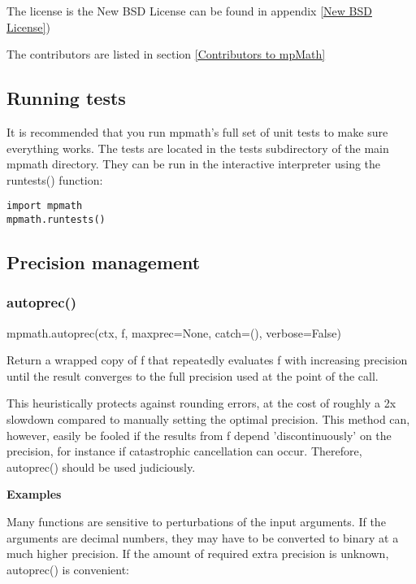 \vpara
The license is the New BSD License  can be found in appendix \ref{New BSD License})

The contributors are listed in section \ref{Contributors to mpMath}



\subsection{Running tests}

It is recommended that you run mpmath's full set of unit tests to make sure everything works. The tests are located in the tests subdirectory of the main mpmath directory. They can be run in the interactive interpreter using the runtests() function:


\begin{lstlisting}
import mpmath
mpmath.runtests()
\end{lstlisting}



\subsection{Precision management}

\subsubsection{autoprec()}

mpmath.autoprec(ctx, f, maxprec=None, catch=(), verbose=False)

\vpara
Return a wrapped copy of f that repeatedly evaluates f with increasing precision until the result converges to the full precision used at the point of the call.

\vpara
This heuristically protects against rounding errors, at the cost of roughly a 2x slowdown compared to manually setting the optimal precision. This method can, however, easily be fooled if the results from f depend 'discontinuously' on the precision, for instance if catastrophic cancellation can occur. Therefore, autoprec() should be used judiciously.

\vpara
\textbf{Examples}

\vpara
Many functions are sensitive to perturbations of the input arguments. If the arguments are decimal numbers, they may have to be converted to binary at a much higher precision. If the amount of required extra precision is unknown, autoprec() is convenient:

